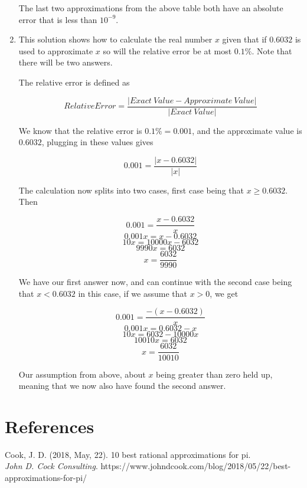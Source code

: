 \documentclass[10pt]{article}
\begin{document}
\begin{enumerate}
   The last two approximations from the above table both have an absolute error that is less than \( 10^{-9} \).

   \item This solution shows how to calculate the real number \( x \) given that if \( 0.6032 \) is used to approximate \( x \) so will the relative error be at most \( 0.1\% \). Note that there will be two answers.
   
   The relative error is defined as
   
   \[ Relative Error = \dfrac{\left| Exact \: Value - Approximate \: Value \right|}{\left| Exact \: Value\right|}\]
   
    We know that the relative error is \( 0.1\% = 0.001 \), and the approximate value is \( 0.6032 \), plugging in these values gives  
   
    \[ 0.001 = \dfrac{ \left| x - 0.6032 \right| }{ \left| x \right| } \]

    The calculation now splits into two cases, first case being that \( x \geq 0.6032 \). Then

    \[ 0.001 = \dfrac{ x - 0.6032 }{ x } \]
    \[ 0.001x =  x - 0.6032 \]
    \[ 10x =  10000x - 6032 \]
    \[ 9990x = 6032 \]
    \[ x = \dfrac{6032}{9990} \]

    We have our first answer now, and can continue with the second case being that \( x < 0.6032 \) in this case, if we assume that \( x > 0 \), we get

    \[ 0.001 = \dfrac{ -(x - 0.6032) }{ x } \]
    \[ 0.001x = 0.6032 - x \]
    \[ 10x =  6032 - 10000x \]
    \[ 10010x = 6032 \]
    \[ x = \dfrac{6032}{10010} \]

    Our assumption from above, about \( x \) being greater than zero held up, meaning that we now also have found the second answer.

\end{enumerate}

\section{References}

Cook, J. D. (2018, May, 22). 10 best rational approximations for pi.\\
\textit{John D. Cock Consulting}. https://www.johndcook.com/blog/2018/05/22/best-approximations-for-pi/
\end{document}

